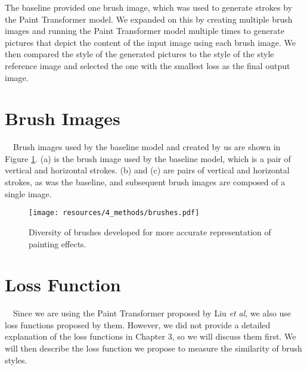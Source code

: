 The baseline provided one brush image, which was used to generate 
strokes by the Paint Transformer model. 
We expanded on this by creating multiple brush images and running 
the Paint Transformer model multiple times to generate pictures 
that depict the content of the input image using each brush image.
We then compared the style of the generated pictures to the style 
of the style reference image and selected the one with the 
smallest loss as the final output image. 

\section{Brush Images}
　Brush images used by the baseline model and created by us are shown in Figure \ref{Brushes}.
(a) is the brush image used by the baseline model, which is a pair of vertical and 
horizontal strokes. 
(b) and (c) are pairs of vertical and horizontal strokes, as was the baseline, 
and subsequent brush images are composed of a single image.
\begin{figure}[h]
    \centering
    \texttt{[image: resources/4\_methods/brushes.pdf]}
    \caption{
        Diversity of brushes developed for more accurate representation of painting effects.
    }
    \label{Brushes}
\end{figure}

\section{Loss Function}
　Since we are using the Paint Transformer proposed by Liu \textit{et al}, 
we also use loss functions proposed by them. However, we did not provide a 
detailed explanation of the loss functions in Chapter 3, so we will discuss 
them first. We will then describe the loss function we propose to measure 
the similarity of brush styles.

